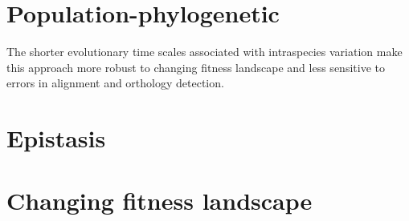 \documentclass{article}
\begin{document}
	\section{Population-phylogenetic}
	
	The shorter evolutionary time scales associated with intraspecies variation make this approach more robust to changing fitness landscape and less sensitive to errors in alignment and orthology detection. 
	
    \section{Epistasis}
   
    \section{Changing fitness landscape}
    
    
\end{document}
